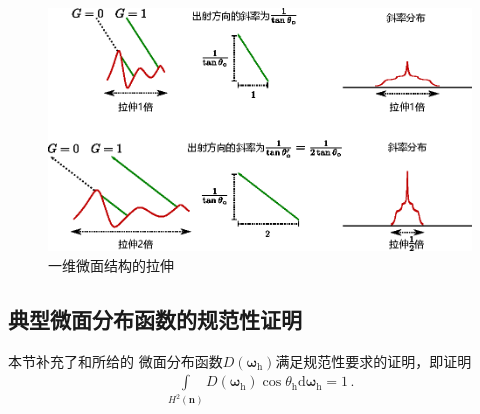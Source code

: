 \begin{figure}[htbp]
    \centering
    \includegraphics[width=0.95\linewidth]{Pictures/chap08/Stretch1D.eps}
    \caption{一维微面结构的拉伸}
    \label{fig:08ex01-Stretch1D}
\end{figure}

\subsection{典型微面分布函数的规范性证明}\label{sub:典型微面分布函数的规范性证明}
本节补充了和所给的
微面分布函数$D({\bm\omega}_{\mathrm{h}})$满足规范性要求的证明，即证明
\begin{align}\label{eq:8.ex-01}
    \int\limits_{H^2({\bm n})}D({\bm\omega}_{\mathrm{h}})\cos\theta_{\mathrm{h}}\mathrm{d}{\bm\omega}_{\mathrm{h}}=1\, .
\end{align}

